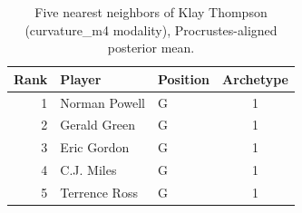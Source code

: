 \begin{table}[htbp]
  \centering\small
  \begin{tabular}{rllc}
    \toprule
    Rank & Player & Position & Archetype \\
    \midrule
    1 & Norman Powell & G & 1 \\
    2 & Gerald Green & G & 1 \\
    3 & Eric Gordon & G & 1 \\
    4 & C.J. Miles & G & 1 \\
    5 & Terrence Ross & G & 1 \\
    \bottomrule
  \end{tabular}
  \caption{Five nearest neighbors of Klay Thompson (curvature_m4 modality), Procrustes-aligned posterior mean.}
  \label{tab:Klay_Thompson_neighbors_curvature_m4}
\end{table}

